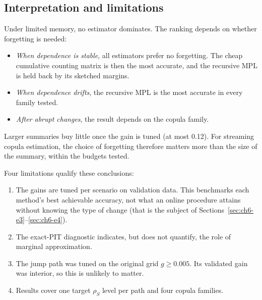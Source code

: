 \subsection{Interpretation and limitations}

Under limited memory, no estimator dominates.
The ranking depends on whether forgetting is needed:
\begin{itemize}
  \item \emph{When dependence is stable}, all estimators prefer no forgetting. The cheap cumulative counting matrix is then the most accurate, and the recursive MPL is held back by its sketched margins.
  \item \emph{When dependence drifts}, the recursive MPL is the most accurate in every family tested.
  \item \emph{After abrupt changes}, the result depends on the copula family.
\end{itemize}
Larger summaries buy little once the gain is tuned (at most 0.12).
For streaming copula estimation, the choice of forgetting therefore matters more than the size of the summary, within the budgets tested.

Four limitations qualify these conclusions:
\begin{enumerate}
  \item The gains are tuned per scenario on validation data. This benchmarks each method's best achievable accuracy, not what an online procedure attains without knowing the type of change (that is the subject of Sections~\ref{sec:ch6-e3}--\ref{sec:ch6-e4}).
  \item The exact-PIT diagnostic indicates, but does not quantify, the role of marginal approximation.
  \item The jump path was tuned on the original grid $g \ge 0.005$. Its validated gain was interior, so this is unlikely to matter.
  \item Results cover one target $\rho_S$ level per path and four copula families.
\end{enumerate}
